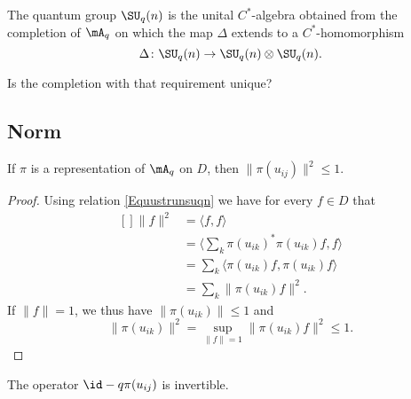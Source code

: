 The quantum group $\SU_q(n)$ is the unital $C^*$-algebra obtained from the completion of $\mA_q$ on which the map $\Delta$ extends to a $C^*$-homomorphism
\begin{equation}
    \Delta\colon \SU_q(n)\to \SU_q(n)\otimes\SU_q(n).
\end{equation}

\begin{probleme}
    Is the completion with that requirement unique?
\end{probleme}

\subsection{Norm}

\begin{proposition}     \label{Propqpiideinve}
    If $\pi$ is a representation of $\mA_q$ on $D$, then $\| \pi(u_{ij}) \|^2\leq 1$.
\end{proposition}

\begin{proof}
    Using relation \eqref{Equustrunsuqn} we have for every $f\in D$ that
    \begin{equation}
        \begin{aligned}[]
            \| f \|^2&=\langle f, f\rangle \\
            &=\langle \sum_k\pi(u_{ik})^*\pi(u_{ik})f, f\rangle \\
            &=\sum_k\langle \pi(u_{ik})f, \pi(u_{ik})f\rangle \\
            &=\sum_k\| \pi(u_{ik})f \|^2.
        \end{aligned}
    \end{equation}
    If $\| f \|=1$, we thus have $\| \pi(u_{ik}) \|\leq 1$ and
    \begin{equation}
        \| \pi(u_{ik}) \|^2=\sup_{\| f \|=1}\| \pi(u_{ik})f \|^2\leq 1.
    \end{equation}
\end{proof}

\begin{corollary}       \label{CorOpOdquijInverti}
    The operator $\id-q\pi(u_{ij})$ is invertible.
\end{corollary}

